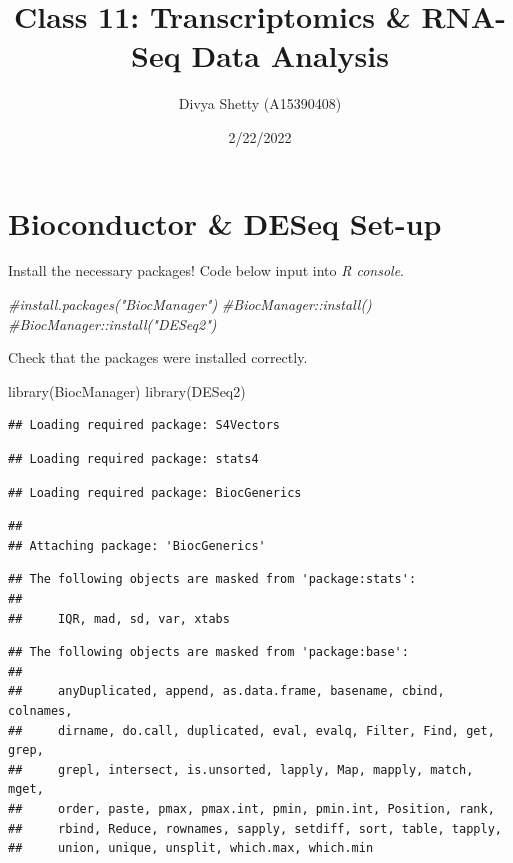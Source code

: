 \documentclass[
]{article}
\title{Class 11: Transcriptomics \& RNA-Seq Data Analysis}
\author{Divya Shetty (A15390408)}
\date{2/22/2022}
\newenvironment{Shaded}{\begin{snugshade}}{\end{snugshade}}
\newcommand{\CommentTok}[1]{\textcolor[rgb]{0.56,0.35,0.01}{\textit{#1}}}
\newcommand{\FunctionTok}[1]{\textcolor[rgb]{0.00,0.00,0.00}{#1}}
\newcommand{\NormalTok}[1]{#1}
\begin{document}
\maketitle

\hypertarget{bioconductor-deseq-set-up}{%
\section{Bioconductor \& DESeq Set-up}\label{bioconductor-deseq-set-up}}

Install the necessary packages! Code below input into \emph{R console}.

\begin{Shaded}
\begin{Highlighting}[]
\CommentTok{\#install.packages("BiocManager")}
\CommentTok{\#BiocManager::install()}
\CommentTok{\#BiocManager::install("DESeq2")}
\end{Highlighting}
\end{Shaded}

Check that the packages were installed correctly.

\begin{Shaded}
\begin{Highlighting}[]
\FunctionTok{library}\NormalTok{(BiocManager)}
\FunctionTok{library}\NormalTok{(DESeq2)}
\end{Highlighting}
\end{Shaded}

\begin{verbatim}
## Loading required package: S4Vectors
\end{verbatim}

\begin{verbatim}
## Loading required package: stats4
\end{verbatim}

\begin{verbatim}
## Loading required package: BiocGenerics
\end{verbatim}

\begin{verbatim}
## 
## Attaching package: 'BiocGenerics'
\end{verbatim}

\begin{verbatim}
## The following objects are masked from 'package:stats':
## 
##     IQR, mad, sd, var, xtabs
\end{verbatim}

\begin{verbatim}
## The following objects are masked from 'package:base':
## 
##     anyDuplicated, append, as.data.frame, basename, cbind, colnames,
##     dirname, do.call, duplicated, eval, evalq, Filter, Find, get, grep,
##     grepl, intersect, is.unsorted, lapply, Map, mapply, match, mget,
##     order, paste, pmax, pmax.int, pmin, pmin.int, Position, rank,
##     rbind, Reduce, rownames, sapply, setdiff, sort, table, tapply,
##     union, unique, unsplit, which.max, which.min
\end{verbatim}
\end{document}
